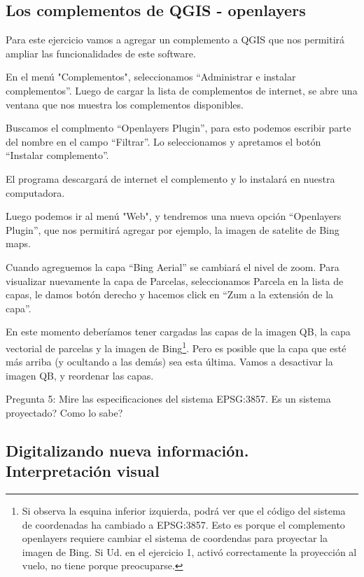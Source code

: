\documentclass[onecolumn]{article}
\begin{document}
\subsection{Los complementos de QGIS - openlayers}

Para este ejercicio vamos a agregar un complemento a QGIS que nos permitirá ampliar las funcionalidades de este software.

En el menú "Complementos", seleccionamos “Administrar e instalar complementos”.  Luego de cargar la lista de complementos de internet, se abre una ventana que nos muestra los complementos disponibles.

Buscamos el complmento “Openlayers Plugin”, para esto podemos escribir parte del nombre en el campo “Filtrar”. Lo seleccionamos y apretamos el botón “Instalar complemento”.

El programa descargará de internet el complemento y lo instalará en nuestra computadora. 

Luego podemos ir al menú "Web", y tendremos una nueva opción “Openlayers Plugin”, que nos permitirá agregar por ejemplo, la imagen de satelite de Bing maps.


Cuando agreguemos la capa “Bing Aerial” se cambiará el nivel de zoom. Para visualizar nuevamente la capa de Parcelas, seleccionamos Parcela en la lista de capas, le damos botón derecho y hacemos click en “Zum a la extensión de la capa”.

En este momento deberíamos tener cargadas las capas de la imagen QB, la capa vectorial de parcelas y la imagen de Bing\footnote{Si observa la esquina inferior izquierda, podrá ver que el código del sistema de coordenadas ha cambiado a EPSG:3857. Esto es porque el complemento openlayers requiere cambiar el sistema de coordendas para proyectar la imagen de Bing. Si Ud. en el ejercicio 1, activó correctamente la proyección al vuelo, no tiene porque preocuparse.}. Pero es posible que la capa que esté más arriba (y ocultando a las demás) sea esta última. Vamos a desactivar la imagen QB, y reordenar las capas. 

\begin{mdframed}[]
	Pregunta 5: Mire las especificaciones del sistema EPSG:3857. Es un sistema proyectado? Como lo sabe?
\end{mdframed}


\subsection{Digitalizando nueva información. Interpretación visual}
\end{document}
